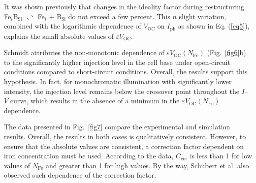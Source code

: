 \documentclass[a4paper,fleqn]{cas-sc}
\begin{document}
It was shown \cite{Olikh2022PPV,Olikh2019SM} previously
that changes in the ideality factor during restructuring Fe$_i$B$_\mathrm{Si}$ $\rightleftharpoons$ Fe$_i$ + B$_\mathrm{Si}$ do not exceed a few percent.
This $n$ slight variation, combined with the logarithmic dependence of $V_\mathrm{OC}$ on $I_\mathrm{ph}$ as shown in Eq. (\ref{eq5}),
explains the small absolute values of $\varepsilon V_\mathrm{OC}$.

Schmidt \cite{FeB:Schmidt} attributes the non-monotonic dependence of $\varepsilon V_\mathrm{OC}\left(N_\mathrm{Fe}\right)$
(Fig.~\ref{fig6}b) to the significantly higher injection level in the cell base under open-circuit conditions
compared to short-circuit conditions.
Overall, the results support this hypothesis.
In fact,
for monochromatic illumination with significantly lower intensity,
the injection level remains below the crossover point \cite{FeB:Schmidt} throughout the $I$--$V$ curve,
which results in the absence of a minimum in the $\varepsilon V_\mathrm{OC}\left(N_\mathrm{Fe}\right)$ dependence.

The data presented in Fig.~\ref{fig7} compare the experimental and simulation results.
Overall, the results in both cases is qualitatively consistent.
However, to ensure that the absolute values are consistent, a correction factor dependent on iron concentration must be used.
According to the data, $C_\mathrm{cor}$ is less than 1 for low values of $N_\mathrm{Fe}$ and greater than 1 for high values.
By the way, Schubert et al. \cite{IronSC} also observed such dependence of the correction factor.
\end{document}

